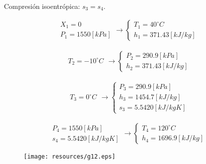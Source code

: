 \documentclass[letter,10pt]{article}
\begin{document}
\begin{enumerate}
Compresión isoentrópica: $s_3 = s_4$.

\begin{eqnarray*}
    \begin{array}{c}
        X_1 = 0 \\
        P_1 = 1550[kPa]
    \end{array}
    \rightarrow
    \begin{cases}
        T_1 = 40^\circ C \\
        h_1 = 371.43[kJ/kg]
    \end{cases}
\end{eqnarray*}

\begin{eqnarray*}
    \begin{array}{c}
        T_2 = -10^\circ C
    \end{array}
    \rightarrow
    \begin{cases}
        P_2 = 290.9[kPa] \\
        h_2 = 371.43[kJ/kg]
    \end{cases}
\end{eqnarray*}

\begin{eqnarray*}
    \begin{array}{c}
        T_3 = 0^\circ C
    \end{array}
    \rightarrow
    \begin{cases}
        P_3 = 290.9[kPa] \\
        h_3 = 1454.7[kJ/kg] \\
        s_3 = 5.5420[kJ/kg K]
    \end{cases}
\end{eqnarray*}

\begin{eqnarray*}
    \begin{array}{c}
        P_4 = 1550[kPa] \\
        s_4 = 5.5420[kJ/kg K]
    \end{array}
    \rightarrow
    \begin{cases}
        T_4 = 120^\circ C \\
        h_4 = 1696.9[kJ/kg]
    \end{cases}
\end{eqnarray*}

\begin{figure}[H]
\centering
\texttt{[image: resources/g12.eps]}
\end{figure}


\end{enumerate}
\end{document}
